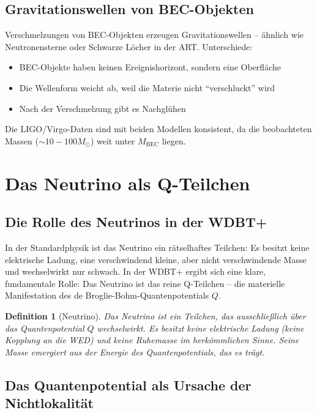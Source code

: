 \documentclass[12pt,a4paper]{article}
\newtheorem{definition}{Definition}[section]
\begin{document}
\subsection{Gravitationswellen von BEC-Objekten}

Verschmelzungen von BEC-Objekten erzeugen Gravitationswellen -- ähnlich wie Neutronensterne oder Schwarze Löcher in der ART. Unterschiede:
\begin{itemize}
\item BEC-Objekte haben keinen Ereignishorizont, sondern eine Oberfläche
\item Die Wellenform weicht ab, weil die Materie nicht \enquote{verschluckt} wird
\item Nach der Verschmelzung gibt es Nachglühen
\end{itemize}
Die LIGO/Virgo-Daten sind mit beiden Modellen konsistent, da die beobachteten Massen ($\sim 10-100 M_{\odot}$) weit unter $M_{\text{BEC}}$ liegen.

\section{Das Neutrino als Q-Teilchen}

\subsection{Die Rolle des Neutrinos in der WDBT+}

In der Standardphysik ist das Neutrino ein rätselhaftes Teilchen: Es besitzt keine elektrische Ladung, eine verschwindend kleine, aber nicht verschwindende Masse und wechselwirkt nur schwach. In der WDBT+ ergibt sich eine klare, fundamentale Rolle: Das Neutrino ist das reine Q-Teilchen -- die materielle Manifestation des de Broglie-Bohm-Quantenpotentials $Q$.

\begin{definition}[Neutrino]
Das Neutrino ist ein Teilchen, das ausschließlich über das Quantenpotential $Q$ wechselwirkt. Es besitzt keine elektrische Ladung (keine Kopplung an die WED) und keine Ruhemasse im herkömmlichen Sinne. Seine Masse emergiert aus der Energie des Quantenpotentials, das es trägt.
\end{definition}

\subsection{Das Quantenpotential als Ursache der Nichtlokalität}
\end{document}
